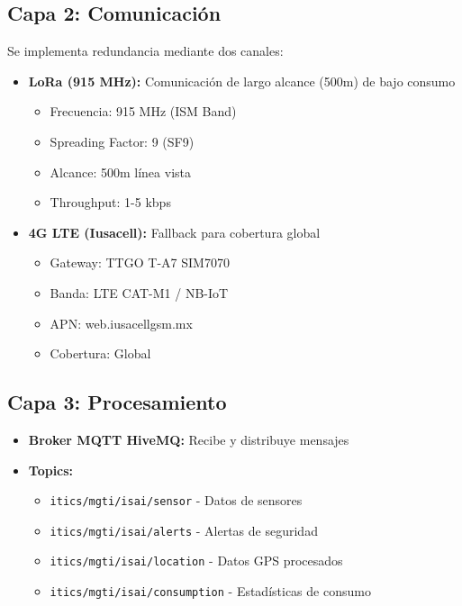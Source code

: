 \documentclass[12pt,a4paper,oneside]{report}
\begin{document}
\subsection{Capa 2: Comunicación}

Se implementa redundancia mediante dos canales:

\begin{itemize}
    \item \textbf{LoRa (915 MHz):} Comunicación de largo alcance (500m) de bajo consumo
    \begin{itemize}
        \item Frecuencia: 915 MHz (ISM Band)
        \item Spreading Factor: 9 (SF9)
        \item Alcance: 500m línea vista
        \item Throughput: 1-5 kbps
    \end{itemize}
    
    \item \textbf{4G LTE (Iusacell):} Fallback para cobertura global
    \begin{itemize}
        \item Gateway: TTGO T-A7 SIM7070
        \item Banda: LTE CAT-M1 / NB-IoT
        \item APN: web.iusacellgsm.mx
        \item Cobertura: Global
    \end{itemize}
\end{itemize}

\subsection{Capa 3: Procesamiento}

\begin{itemize}
    \item \textbf{Broker MQTT HiveMQ:} Recibe y distribuye mensajes
    \item \textbf{Topics:}
    \begin{itemize}
        \item \texttt{itics/mgti/isai/sensor} - Datos de sensores
        \item \texttt{itics/mgti/isai/alerts} - Alertas de seguridad
        \item \texttt{itics/mgti/isai/location} - Datos GPS procesados
        \item \texttt{itics/mgti/isai/consumption} - Estadísticas de consumo
    \end{itemize}
\end{itemize}
\end{document}
